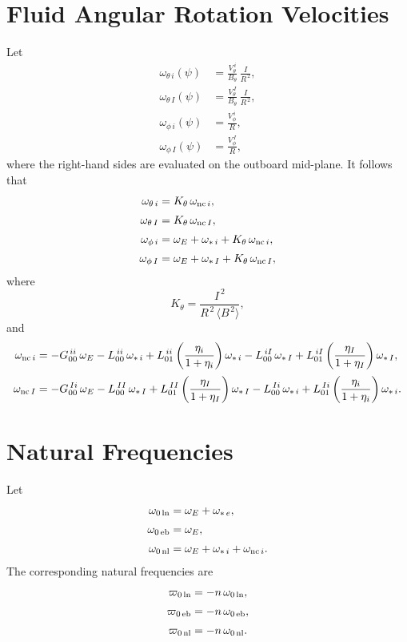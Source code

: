 \documentclass[notitlepage,12pt]{article}
\begin{document}
\section{Fluid Angular Rotation Velocities}
Let
\begin{align}
\omega_{\theta\,i}(\psi)&=\frac{V_\theta^{\,i}}{B_\theta}\,\frac{I}{R^{\,2}},\\[0.5ex]
\omega_{\theta\,I}(\psi)&=\frac{V_\theta^{\,I}}{B_\theta}\,\frac{I}{R^{\,2}},\\[0.5ex]
\omega_{\phi\,i}(\psi) &= \frac{V_\phi^{\,i}}{R},\\[0.5ex]
\omega_{\phi\,I}(\psi) &= \frac{V_\phi^{\,I}}{R},
\end{align}
where the right-hand sides are evaluated on the outboard mid-plane.
It follows that
\begin{align}
\omega_{\theta\,i}&= K_\theta\,\omega_{{\rm nc}\,i},\\[0.5ex]
\omega_{\theta\,I} &= K_\theta\,\omega_{{\rm nc}\,I},\\[0.5ex]
\omega_{\phi\,i} &= \omega_E+\omega_{\ast\,i} +K_\theta\, \omega_{{\rm nc}\,i},\\[0.5ex]
\omega_{\phi\,I} &= \omega_E+\omega_{\ast\,I} + K_\theta\,\omega_{{\rm nc}\,I},
\end{align}
where
\begin{equation}
K_\theta = \frac{I^{\,2}}{R^{\,2}\,\langle B^{\,2}\rangle},
\end{equation}
and 
\begin{align}
\omega_{{\rm nc}\,i}&= -G^{\,ii}_{00}\,\omega_E-L^{\,ii}_{00}\,\omega_{\ast\,i}+L^{\,ii}_{01}\left(\frac{\eta_i}{1+\eta_i}\right)\omega_{\ast\,i}-
L^{\,iI}_{00}\,\omega_{\ast\,I}+L^{\,iI}_{01}\left(\frac{\eta_I}{1+\eta_I}\right)\omega_{\ast\,I},\\[0.5ex]
\omega_{{\rm nc}\,I}&= -G^{\,Ii}_{00}\,\omega_E-L^{\,II}_{00}\,\omega_{\ast\,I}+L^{\,II}_{01}\left(\frac{\eta_I}{1+\eta_I}\right)\omega_{\ast\,I}-
L^{\,Ii}_{00}\,\omega_{\ast\,i}+L^{\,Ii}_{01}\left(\frac{\eta_i}{1+\eta_i}\right)\omega_{\ast\,i}.
\end{align}

\section{Natural Frequencies}
Let
\begin{align}
\omega_{0\,{\rm ln}} &=\omega_E+\omega_{\ast\,e},\\[0.5ex]
\omega_{0\,{\rm eb}} &= \omega_E,\\[0.5ex]
\omega_{0\,{\rm nl}} &=\omega_E+\omega_{\ast\,i}+ \omega_{{\rm nc}\,i}.
\end{align}
The corresponding natural frequencies are
\begin{align}
\varpi_{0\,{\rm ln}} &=-n\,\omega_{0\,{\rm ln}} ,\\[0.5ex]
\varpi_{0\,{\rm eb}} &= -n\,\omega_{0\,{\rm eb}} ,\\[0.5ex]
\varpi_{0\,{\rm nl}} &=-n\,\omega_{0\,{\rm nl}} .
\end{align}
\end{document}

